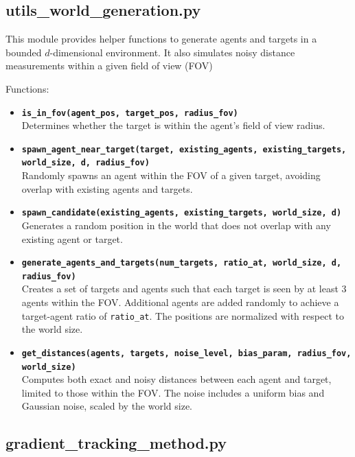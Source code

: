 \subsection*{\textbf{utils\_world\_generation.py}}

This module provides helper functions to generate agents and targets in a bounded $d$-dimensional environment. It also simulates noisy distance measurements within a given field of 
view (FOV)

\noindent Functions: 

\begin{itemize}
    \item \textbf{\texttt{is\_in\_fov(agent\_pos, target\_pos, radius\_fov)}}\\
    Determines whether the target is within the agent's field of view radius.

    \item \textbf{\texttt{spawn\_agent\_near\_target(target, existing\_agents, existing\_targets, world\_size, d, radius\_fov)}}\\
    Randomly spawns an agent within the FOV of a given target, avoiding overlap with existing agents and targets.

    \item \textbf{\texttt{spawn\_candidate(existing\_agents, existing\_targets, world\_size, d)}}\\
    Generates a random position in the world that does not overlap with any existing agent or target.

    \item \textbf{\texttt{generate\_agents\_and\_targets(num\_targets, ratio\_at, world\_size, d, radius\_fov)}}\\
    Creates a set of targets and agents such that each target is seen by at least 3 agents within the FOV. Additional agents are added randomly to achieve a target-agent ratio of 
    \texttt{ratio\_at}. The positions are normalized with respect to the world size.

    \item \textbf{\texttt{get\_distances(agents, targets, noise\_level, bias\_param, radius\_fov, world\_size)}}\\
    Computes both exact and noisy distances between each agent and target, limited to those within the FOV. The noise includes a uniform bias and Gaussian noise, scaled by the 
    world size.
\end{itemize}


\subsection*{gradient\_tracking\_method.py }

